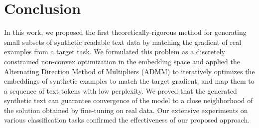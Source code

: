 \section{Conclusion}
In this work, we proposed the first theoretically-rigorous method for generating small subsets of synthetic readable text data by matching the gradient of real examples from a target task. We formulated this problem as a discretely constrained non-convex optimization in the embedding space and applied the Alternating Direction Method of Multipliers (ADMM) to iteratively optimizes the embeddings of synthetic examples to match the target gradient, and map them to a sequence of text tokens with low perplexity. We proved that the generated synthetic text can guarantee convergence of the model to a close neighborhood of the solution obtained by fine-tuning on real data. Our extensive experiments on various classification %
tasks confirmed the effectiveness of our proposed approach. 